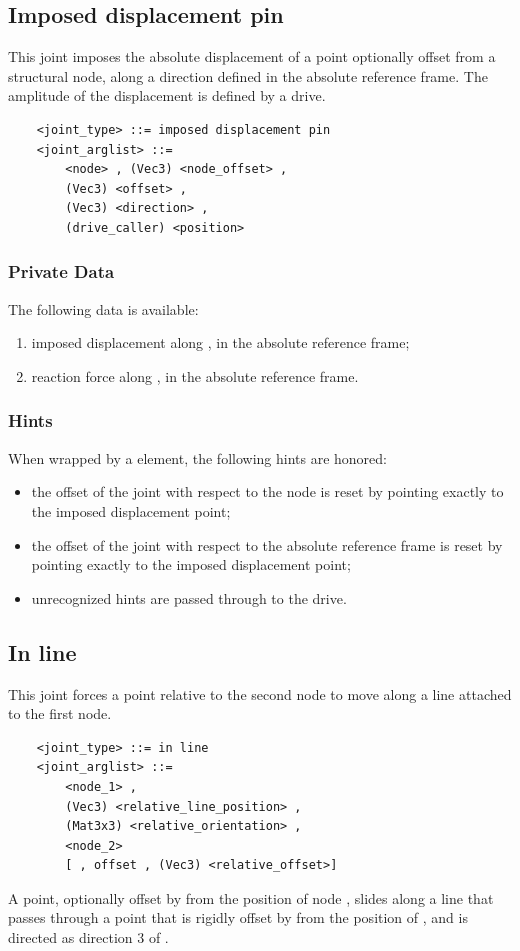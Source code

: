 \subsection{Imposed displacement pin}
\label{sec:EL:JOINT:IMPOSEDDISPLACEMENTPIN}
This joint imposes the absolute displacement of a point optionally offset
from a structural node, along a direction defined
in the absolute reference frame.
The amplitude of the displacement is defined by a drive.
\begin{verbatim}
    <joint_type> ::= imposed displacement pin
    <joint_arglist> ::= 
        <node> , (Vec3) <node_offset> ,
        (Vec3) <offset> ,
        (Vec3) <direction> ,
        (drive_caller) <position>
\end{verbatim}

\subsubsection{Private Data}
The following data is available:
\begin{enumerate}
\item {} imposed displacement along ,
in the absolute reference frame;
\item {} reaction force along ,
in the absolute reference frame.
\end{enumerate}

\subsubsection{Hints}
When wrapped by a  element, the following hints are honored:
\begin{itemize}
\item {} the offset of the joint
with respect to the node is reset by pointing exactly
to the imposed displacement point;
\item {} the offset of the joint
with respect to the absolute reference frame is reset by pointing exactly
to the imposed displacement point;
\item unrecognized hints are passed through to the drive.
\end{itemize}




\subsection{In line}
This joint forces a point relative to the second node to move 
along a line attached to the first node.
\begin{verbatim}
    <joint_type> ::= in line
    <joint_arglist> ::= 
        <node_1> , 
        (Vec3) <relative_line_position> ,
        (Mat3x3) <relative_orientation> ,
        <node_2>
        [ , offset , (Vec3) <relative_offset>]
\end{verbatim}
A point, optionally offset by  from the position
of node , slides along a line that passes through a point 
that is rigidly offset by 
from the position of , and is directed as direction 3 
of .



